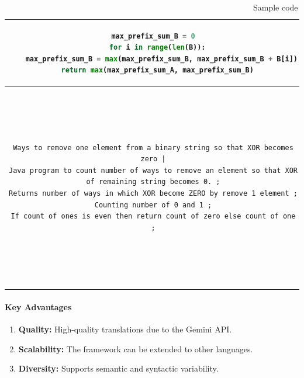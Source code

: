 \documentclass{dhbenelux}
\begin{document}
\begin{table}[h!]
{\begin{tabular}{|c|c|c|}
\begin{minipage}[t]{0.3\textwidth}
\begin{lstlisting}[language=Python, basicstyle=\ttfamily\scriptsize, breaklines=true]
  max_prefix_sum_B = 0
  for i in range(len(B)):
    max_prefix_sum_B = max(max_prefix_sum_B, max_prefix_sum_B + B[i])
  return max(max_prefix_sum_A, max_prefix_sum_B)
\end{lstlisting}
\end{minipage}
\\
\hline
\begin{minipage}[t]{0.3\textwidth}
\begin{lstlisting}[basicstyle=\ttfamily\scriptsize, breaklines=true]
Ways to remove one element from a binary string so that XOR becomes zero |
Java program to count number of ways to remove an element so that XOR of remaining string becomes 0. ;
Returns number of ways in which XOR become ZERO by remove 1 element ;
Counting number of 0 and 1 ;
If count of ones is even then return count of zero else count of one ;
\end{lstlisting}
\end{minipage}
&
\begin{minipage}[t]{0.3\textwidth}
\begin{lstlisting}[language=Java, basicstyle=\ttfamily\scriptsize, breaklines=true]
public static int countWays(String str) {
    int count0 = 0;
    int count1 = 0;
    for (int i = 0; i < str.length(); i++) {
      if (str.charAt(i) == '0') {
        count0++;
      } else {
        count1++;
      }
    }
    if (count1 % 2 == 0) {
      return count0;
    } else {
      return count1;
    }
  }
\end{lstlisting}
\end{minipage}
&
\begin{minipage}[t]{0.3\textwidth}
\begin{lstlisting}[language=Python, basicstyle=\ttfamily\scriptsize, breaklines=true]
def count_ways(s):
  count_zero = s.count('0')
  count_one = s.count('1')
  if count_one % 2 == 0:
    return count_zero
  else:
    return count_one
\end{lstlisting}
\end{minipage}
\\
\hline
\end{tabular}
}
\caption{Sample code snippets in a table}
\end{table}

\paragraph{Key Advantages}
\begin{enumerate}
    \item \textbf{Quality:} High-quality translations due to the Gemini API.
    \item \textbf{Scalability:} The framework can be extended to other languages.
    \item \textbf{Diversity:} Supports semantic and syntactic variability.
\end{enumerate}
\end{document}
